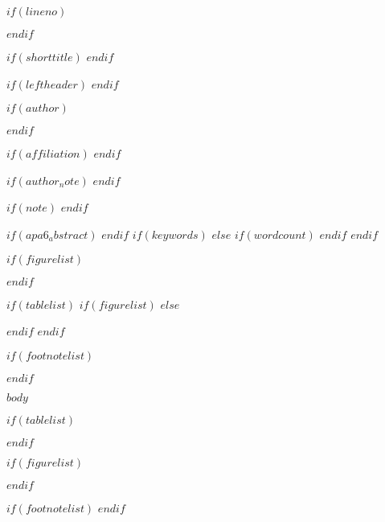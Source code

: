 $if(lineno)$ %
  \usepackage{lineno}
  \linenumbers
$endif$

$if(shorttitle)$
$endif$

$if(leftheader)$
$endif$

$if(author)$
  \author{$for(author)$$author.name$$endfor$}

$endif$

$if(affiliation)$
$endif$

$if(author_note)$
$endif$

$if(note)$
$endif$

$if(apa6_abstract)$
$endif$
$if(keywords)$
$else$
  $if(wordcount)$
  $endif$
$endif$

$if(figurelist)$
\usepackage[titles]{tocloft}
\renewcommand{\cftfigpresnum}{\itshape\figurename\enspace}
\renewcommand{\cftfigaftersnum}{.\space}
\setlength{\cftfigindent}{0pt}
\setlength{\cftafterloftitleskip}{0pt}
\settowidth{\cftfignumwidth}{Figure 10.\qquad}
$endif$

$if(tablelist)$
$if(figurelist)$
$else$
\usepackage[titles]{tocloft}
$endif$
\renewcommand{\cfttabpresnum}{\itshape\tablename\enspace}
\renewcommand{\cfttabaftersnum}{.\space}
\setlength{\cfttabindent}{0pt}
\setlength{\cftafterloftitleskip}{0pt}
\settowidth{\cfttabnumwidth}{Table 10.\qquad}
$endif$

$if(footnotelist)$
\usepackage{endnotes}
\let\footnote\endnote
$endif$




$body$

$if(tablelist)$
\clearpage
\renewcommand{\listtablename}{Table captions}
\listoftables
$endif$

$if(figurelist)$
\clearpage
\renewcommand{\listfigurename}{Figure captions}
\listoffigures
$endif$

$if(footnotelist)$
\theendnotes
$endif$


